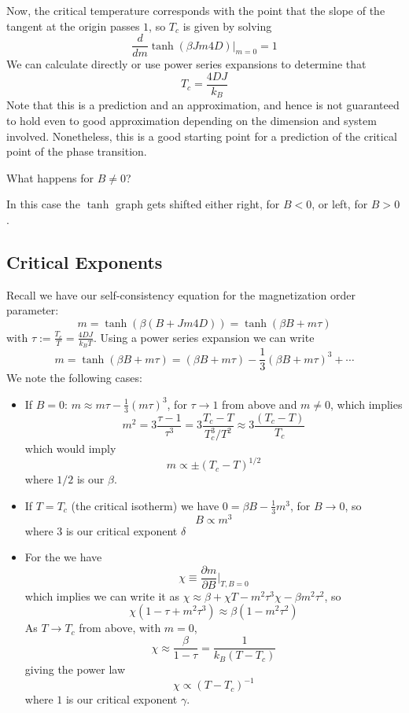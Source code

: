 \documentclass[12pt, a4paper, oneside, openright, titlepage]{book}
\begin{document}
Now, the critical temperature corresponds with the point that the slope of the tangent at the origin passes $1$, so $T_c$ is given by solving $$\frac{d}{dm}\tanh(\beta Jm4D)\Bigg\rvert_{m=0} = 1$$
We can calculate directly or use power series expansions to determine that $$T_c = \frac{4DJ}{k_B}$$
Note that this is a prediction and an approximation, and hence is not guaranteed to hold even to good approximation depending on the dimension and system involved. Nonetheless, this is a good starting point for a prediction of the critical point of the phase transition.

\begin{qst}
    What happens for $B \neq 0$?
\end{qst}
In this case the $\tanh$ graph gets shifted either right, for $B < 0$, or left, for $B > 0$.


\subsection{Critical Exponents}

Recall we have our self-consistency equation for the magnetization order parameter: $$m = \tanh(\beta(B+Jm4D)) = \tanh(\beta B+m\tau)$$ 
with $\tau := \frac{T_c}{T} = \frac{4DJ}{k_BT}$. Using a power series expansion we can write \begin{equation*}
    m = \tanh(\beta B+m\tau) = (\beta B+m\tau) -\frac{1}{3}(\beta B+m\tau)^3+\cdots
\end{equation*}
We note the following cases:
\begin{itemize}
    \item If $B = 0$: $m \approx m\tau - \frac{1}{3}(m\tau)^3$, for $\tau\rightarrow 1$ from above and $m \neq 0$, which implies $$m^2 = 3\frac{\tau-1}{\tau^3} = 3\frac{T_c-T}{T_c^3/T^2} \approx 3\frac{(T_c-T)}{T_c}$$
        which would imply $$m\propto \pm(T_c-T)^{1/2}$$
        where $1/2$ is our  $\beta$.
    \item If $T = T_c$ (the critical isotherm) we have $0 = \beta B -\frac{1}{3}m^3$, for $B\rightarrow 0$, so $$B\propto m^3$$
        where $3$ is our critical exponent $\delta$
    \item For the  we have \begin{equation*}
            \chi \equiv \frac{\partial m}{\partial B}\Bigg\rvert_{T,B=0}
    \end{equation*}
        which implies we can write it as $\chi\approx \beta +\chi T -m^2\tau^3\chi - \beta m^2\tau^2$, so $$\chi(1-\tau+m^2\tau^3) \approx \beta(1-m^2\tau^2)$$
        As $T\rightarrow T_c$ from above, with $m = 0$, $$\chi \approx \frac{\beta}{1-\tau} = \frac{1}{k_B(T-T_c)}$$
        giving the power law $$\chi\propto (T-T_c)^{-1}$$ 
        where $1$ is our critical exponent $\gamma$.
\end{itemize}
\end{document}
